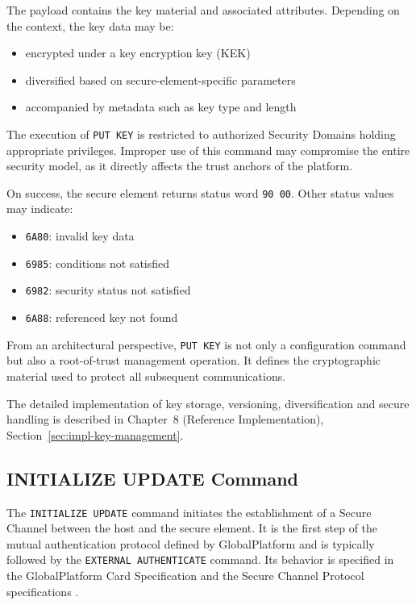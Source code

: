 The payload contains the key material and associated attributes. Depending on the context,
the key data may be:
\begin{itemize}
\item encrypted under a key encryption key (KEK)
\item diversified based on secure-element-specific parameters
\item accompanied by metadata such as key type and length
\end{itemize}

The execution of \texttt{PUT KEY} is restricted to authorized Security Domains holding
appropriate privileges. Improper use of this command may compromise the entire security
model, as it directly affects the trust anchors of the platform.

On success, the secure element returns status word \texttt{90 00}. Other status values may indicate:
\begin{itemize}
\item \texttt{6A80}: invalid key data
\item \texttt{6985}: conditions not satisfied
\item \texttt{6982}: security status not satisfied
\item \texttt{6A88}: referenced key not found
\end{itemize}

From an architectural perspective, \texttt{PUT KEY} is not only a configuration command but
also a root-of-trust management operation. It defines the cryptographic material used to
protect all subsequent communications.

The detailed implementation of key storage, versioning, diversification and secure
handling is described in Chapter~8 (Reference Implementation),
Section~\ref{sec:impl-key-management}.

\subsection{INITIALIZE UPDATE Command}

The \texttt{INITIALIZE UPDATE} command initiates the establishment of a Secure
Channel between the host and the secure element. It is the first step of the
mutual authentication protocol defined by GlobalPlatform and is typically
followed by the \texttt{EXTERNAL AUTHENTICATE} command. Its behavior is
specified in the GlobalPlatform Card Specification and the Secure Channel
Protocol specifications  .

